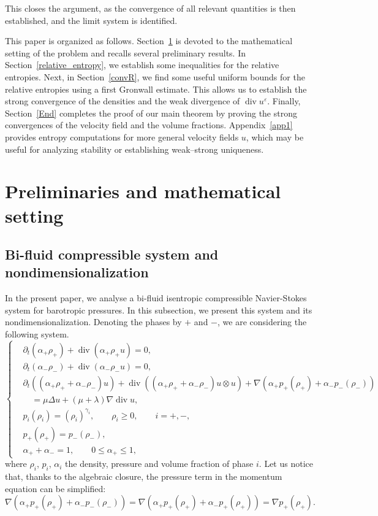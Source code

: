 \documentclass[11pt, twoside, a4paper]{article}
\theoremstyle{plain}
\theoremstyle{remark}
\numberwithin{equation}{section}
\renewcommand{\div}{\operatorname{div}}
\renewcommand{\leq}{\leqslant}\renewcommand{\le}{\leqslant}
\renewcommand{\geq}{\geqslant}\renewcommand{\ge}{\geqslant}
\newcommand{\eps}{\varepsilon}
\newcommand{\ap}{\alpha_+}
\begin{document}
This closes the argument, as the convergence of all relevant quantities is then established, and the limit system is identified.

\bigskip

This paper is organized as follows. Section~\ref{recall} is devoted to the mathematical setting of the problem and recalls several preliminary results. In Section~\ref{relative_entropy}, we establish some inequalities for the relative entropies.
Next, in Section~\ref{convR}, we find some useful uniform bounds for the relative entropies using a first Gronwall estimate. This allows us to establish the strong convergence of the densities and the weak divergence of $\div u^\eps$. Finally, Section~\ref{End} completes the proof of our main theorem by proving the strong convergences of the velocity field and the volume fractions. Appendix~\ref{app1} provides entropy computations for more general velocity fields $u$, which may be useful for analyzing stability or establishing weak–strong uniqueness.



\section{Preliminaries and mathematical setting}\label{recall}

\subsection{Bi-fluid compressible system and nondimensionalization}\label{nondim}

In the present paper, we analyse a bi-fluid isentropic compressible Navier-Stokes system for barotropic pressures. In this subsection, we present this system and its nondimensionalization. Denoting the phases by $+$ and $-$, we are considering the following system.
\begin{equation}
 \left\{
 \begin{aligned}\label{system}
 &\partial_t (\alpha_+ \rho_+) + \div(\alpha_+\rho_+u) = 0,\\
 &\partial_t (\alpha_- \rho_-) + \div(\alpha_-\rho_-u) = 0,\\
 &\partial_t ((\alpha_+ \rho_+ + \alpha_- \rho_-)u) + \div((\alpha_+\rho_+ + \alpha_-\rho_-)u\otimes u) +\nabla (\alpha_+p_+(\rho_+)+\alpha_-p_-(\rho_-)) \\
 &\quad = \mu \Delta u + (\mu + \lambda)\nabla \div u,\\
 &p_i(\rho_i) = (\rho_i)^{\gamma_i}, \qquad \rho_i \geq 0, \qquad i=+,-,\\
 &p_+(\rho_+) = p_-(\rho_-), \\
 &\alpha_+ + \alpha_- = 1,\qquad 0\leq \ap \leq 1,
 \end{aligned}
 \right .
\end{equation}
where $\rho_i$, $p_i$, $\alpha_i$ the density, pressure and volume fraction of phase $i$. 
Let us notice that, thanks to the algebraic closure, the pressure term in the momentum equation can be simplified:
\[
\nabla (\alpha_+p_+(\rho_+)+\alpha_-p_-(\rho_-)) = \nabla (\alpha_+p_+(\rho_+)+\alpha_-p_+(\rho_+))=\nabla p_+(\rho_+).
\]
\end{document}
